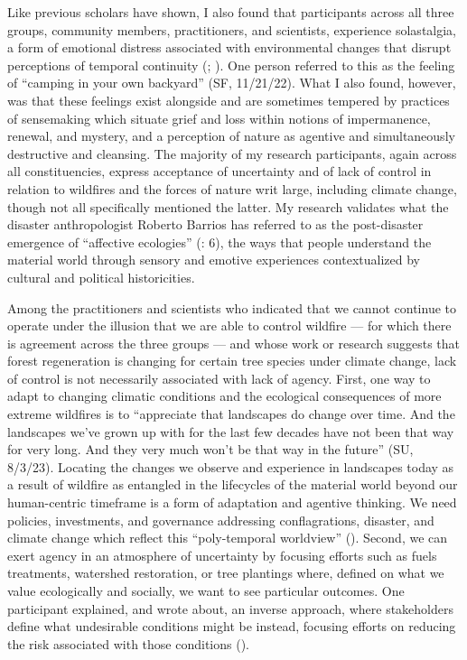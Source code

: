\documentclass[
]{article}
\begin{document}
Like previous scholars have shown, I also found that participants across all three groups, community members, practitioners, and scientists, experience solastalgia, a form of emotional distress associated with environmental changes that disrupt perceptions of temporal continuity (; ). One person referred to this as the feeling of ``camping in your own backyard'' (SF, 11/21/22). What I also found, however, was that these feelings exist alongside and are sometimes tempered by practices of sensemaking which situate grief and loss within notions of impermanence, renewal, and mystery, and a perception of nature as agentive and simultaneously destructive and cleansing. The majority of my research participants, again across all constituencies, express acceptance of uncertainty and of lack of control in relation to wildfires and the forces of nature writ large, including climate change, though not all specifically mentioned the latter. My research validates what the disaster anthropologist Roberto Barrios has referred to as the post-disaster emergence of ``affective ecologies'' (: 6), the ways that people understand the material world through sensory and emotive experiences contextualized by cultural and political historicities.

Among the practitioners and scientists who indicated that we cannot continue to operate under the illusion that we are able to control wildfire --- for which there is agreement across the three groups --- and whose work or research suggests that forest regeneration is changing for certain tree species under climate change, lack of control is not necessarily associated with lack of agency. First, one way to adapt to changing climatic conditions and the ecological consequences of more extreme wildfires is to ``appreciate that landscapes do change over time. And the landscapes we've grown up with for the last few decades have not been that way for very long. And they very much won't be that way in the future'' (SU, 8/3/23). Locating the changes we observe and experience in landscapes today as a result of wildfire as entangled in the lifecycles of the material world beyond our human-centric timeframe is a form of adaptation and agentive thinking. We need policies, investments, and governance addressing conflagrations, disaster, and climate change which reflect this ``poly-temporal worldview'' (). Second, we can exert agency in an atmosphere of uncertainty by focusing efforts such as fuels treatments, watershed restoration, or tree plantings where, defined on what we value ecologically and socially, we want to see particular outcomes. One participant explained, and wrote about, an inverse approach, where stakeholders define what undesirable conditions might be instead, focusing efforts on reducing the risk associated with those conditions ().
\end{document}
